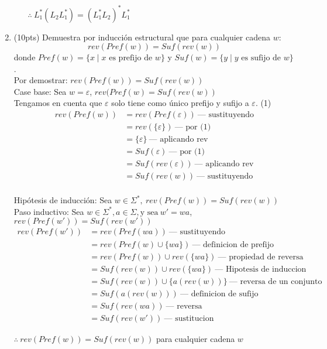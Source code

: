 \documentclass{article}
\begin{document}
\begin{enumerate}
\begin{enumerate}
        $\therefore ~ L_1^*(L_2L_1^*) = (L_1^*L_2)^*L_1^*$
    \end{enumerate}
    
    \item (10pts) Demuestra por inducción estructural que para cualquier cadena $w$:
    \[
        \textit{rev} (\textit{Pref}(w)) = \textit{Suf} (\textit{rev} (w))
    \]
    donde $\textit{Pref}(w) = \{ x \mid x \text{ es prefijo de } w \}$ y $\textit{Suf}(w) = \{ y \mid y \text{ es sufijo de } w \}$. \\

    Por demostrar: $rev(Pref(w)) = Suf(rev(w))$ \\
    
    Case base: Sea $w = \varepsilon$, $rev(Pref(w) = Suf(rev(w))$ \\
    Tengamos en cuenta que $\varepsilon$ solo tiene como único prefijo y sufijo a $\varepsilon$. (1) \\
    \begin{align*}
      rev(Pref(w)) &= rev(Pref(\varepsilon)) ~\mbox{--- sustituyendo}\\
                      &= rev(\{\varepsilon\}) ~\mbox{--- por (1)}\\
                      &= \{\varepsilon\} ~\mbox{--- aplicando rev}\\
                      &= Suf(\varepsilon) ~\mbox{--- por (1)}\\
                      &= Suf(rev(\varepsilon)) ~\mbox{--- aplicando rev}\\
                      &= Suf(rev(w)) ~\mbox{--- sustituyendo}\\
    \end{align*}

    Hipótesis de inducción: Sea $ w \in \Sigma^*,~ rev(Pref(w)) = Suf(rev(w))$ \\

    Paso inductivo: Sea $w \in \Sigma^*, a \in \Sigma, \mbox{y sea}~ w' =wa$, $rev(Pref(w')) = Suf(rev(w'))$
    \begin{align*}
      rev(Pref(w')) &= rev(Pref(wa)) ~\mbox{--- sustituyendo} \\
                      &= rev(Pref(w) \cup \{wa\}) ~\mbox{--- definicion de prefijo} \\
                      &= rev(Pref(w)) \cup rev(\{wa\}) ~\mbox{--- propiedad de reversa} \\
                      &= Suf(rev(w)) \cup rev(\{wa\}) ~\mbox{--- Hipotesis de induccion} \\
                      &= Suf(rev(w)) \cup \{a(rev(w))\} ~\mbox{--- reversa de un conjunto} \\
                      &= Suf(a (rev(w))) ~\mbox{--- definicion de sufijo} \\
                      &= Suf(rev(wa)) ~\mbox{--- reversa} \\
                      &= Suf(rev(w')) ~\mbox{--- sustitucion}
    \end{align*}

    $\therefore ~rev(Pref(w)) = Suf(rev(w))$ para cualquier cadena $w$
\end{enumerate}
\end{document}
